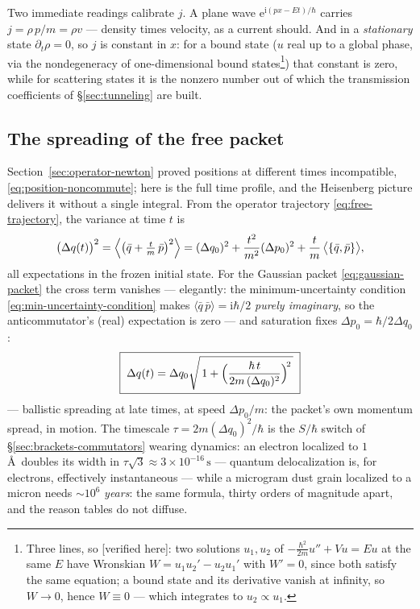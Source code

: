 \documentclass[11pt]{article}
\theoremstyle{plain}
\theoremstyle{definition}
\theoremstyle{remark}
\newcommand{\ee}{\mathrm{e}}
\newcommand{\ii}{\mathrm{i}}
\begin{document}
Two immediate readings calibrate $j$. A plane wave
$\ee^{\ii(px - Et)/\hbar}$ carries $j = \rho\,p/m = \rho v$ ---
density times velocity, as a current should. And in a
\emph{stationary} state $\partial_t\rho = 0$, so $j$ is constant in
$x$: for a bound state ($u$ real up to a global phase, via the
nondegeneracy of one-dimensional bound states\footnote{Three lines,
so [verified here]: two solutions $u_1, u_2$ of
$-\tfrac{\hbar^2}{2m}u'' + Vu = Eu$ at the same $E$ have Wronskian
$W = u_1 u_2' - u_2 u_1'$ with $W' = 0$, since both satisfy the same
equation; a bound state and its derivative vanish at infinity, so
$W \to 0$, hence $W \equiv 0$ --- which integrates to
$u_2 \propto u_1$.}) that
constant is zero, while for scattering states it is the
nonzero number out of which the transmission coefficients of
\S\ref{sec:tunneling} are built.

\subsection{The spreading of the free packet}
\label{sec:spreading}

Section~\ref{sec:operator-newton} proved positions at different
times incompatible, \eqref{eq:position-noncommute}; here is the full
time profile, and the Heisenberg picture delivers it without a
single integral. From the operator trajectory
\eqref{eq:free-trajectory}, the variance at time $t$ is
\begin{equation}
  \bigl(\Delta q(t)\bigr)^2
  = \Bigl\langle
      \bigl(\bar q + \tfrac tm\,\bar p\bigr)^2
    \Bigr\rangle
  = (\Delta q_0)^2
  + \frac{t^2}{m^2}(\Delta p_0)^2
  + \frac tm\,
    \bigl\langle\{\bar q, \bar p\}\bigr\rangle ,
\end{equation}
all expectations in the frozen initial state. For the Gaussian
packet \eqref{eq:gaussian-packet} the cross term vanishes ---
elegantly: the minimum-uncertainty condition
\eqref{eq:min-uncertainty-condition} makes
$\langle\bar q\,\bar p\rangle = \ii\hbar/2$ \emph{purely imaginary},
so the anticommutator's (real) expectation is zero --- and
saturation fixes $\Delta p_0 = \hbar/2\Delta q_0$:
\begin{equation}
  \boxed{\;
  \Delta q(t)
  = \Delta q_0
    \sqrt{\,1 + \Bigl(
      \frac{\hbar\, t}{2m\,(\Delta q_0)^2}
    \Bigr)^{\!2}\,}
  \;}
  \label{eq:spreading}
\end{equation}
--- ballistic spreading at late times, at speed $\Delta p_0/m$: the
packet's own momentum spread, in motion. The timescale
$\tau = 2m(\Delta q_0)^2/\hbar$ is the $S/\hbar$ switch of
\S\ref{sec:brackets-commutators} wearing dynamics: an electron
localized to $1\,$\AA\ doubles its width in
$\tau\sqrt3 \approx 3\times10^{-16}\,\mathrm s$ --- quantum
delocalization is, for electrons, effectively instantaneous ---
while a microgram dust grain localized to a micron needs
$\sim 10^{6}$ \emph{years}: the same formula, thirty orders of
magnitude apart, and the reason tables do not diffuse.
\end{document}
